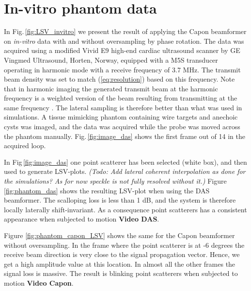 \documentclass[journal]{IEEEtran}
\newcommand\multimedia[1]{\textbf{{\color{red}#1}}}
\newcommand\comment[1]{\textit{{\color{red}(#1)}}}
\begin{document}
\section{In-vitro phantom data}\label{sec:res}
In Fig.\,\ref{fig:LSV_invitro} we present the result of applying the Capon beamformer on \textit{in-vitro} data with and without oversampling by phase rotation. The data was acquired using a modified Vivid E9 high-end cardiac ultrasound scanner by GE Vingmed Ultrasound, Horten, Norway, equipped with a M5S transducer operating in harmonic mode with a receive frequency of 3.7 MHz. The transmit beam density was set to match (\ref{eq:resolution}) based on this frequency. Note that in harmonic imaging the generated transmit beam at the harmonic frequency is a weighted version of the beam resulting from transmitting at the same frequency \cite{Fedewa2004}. The lateral sampling is therefore better than what was used in simulations. A tissue mimicking phantom containing wire targets and anechoic cysts was imaged, and the data was acquired while the probe was moved across the phantom manually. Fig.\,\ref{fig:image_das} shows the first frame out of 14 in the acquired loop. %

In Fig\,\ref{fig:image_das} one point scatterer has been selected (white box), and then used to generate LSV-plots. \comment{Todo: Add lateral coherent interpolation as done for the simulations? As for now speckle is not fully resolved without it.} Figure \ref{fig:phantom_das} shows the resulting LSV-plot when using the DAS beamformer. The scalloping loss is less than 1 dB, and the system is therefore locally laterally shift-invariant. As a consequence point scatterers has a consistent appearance when subjected to motion \multimedia{Video DAS}.  

Figure \ref{fig:phantom_capon_LSV} shows the same for the Capon beamformer without oversampling. In the frame where the point scatterer is at -6 degrees the receive beam direction is very close to the signal propagation vector. Hence, we get a high amplitude value at this location. In almost all the other frames the signal loss is massive. The result is blinking point scatterers when subjected to motion \multimedia{Video Capon}. 
\end{document}
